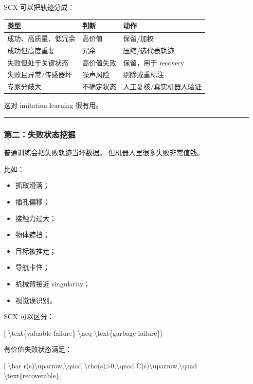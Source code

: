 \documentclass[
  12pt,
]{ctexart}
\providecommand{\tightlist}{%
  \setlength{\itemsep}{0pt}\setlength{\parskip}{0pt}}
\begin{document}
SCX 可以把轨迹分成：

\begin{longtable}[]{@{}lll@{}}
\toprule\noalign{}
类型 & 判断 & 动作 \\
\midrule\noalign{}
\endhead
\bottomrule\noalign{}
\endlastfoot
成功、高质量、低冗余 & 高价值 & 保留/加权 \\
成功但高度重复 & 冗余 & 压缩/选代表轨迹 \\
失败但处于关键状态 & 高价值失败 & 保留，用于 recovery \\
失败且异常/传感器坏 & 噪声风险 & 剔除或重标注 \\
专家分歧大 & 不确定状态 & 人工复核/真实机器人验证 \\
\end{longtable}

这对 imitation learning 很有用。

\begin{center}\rule{0.5\linewidth}{0.5pt}\end{center}

\subsubsection{第二：失败状态挖掘}\label{ux7b2cux4e8cux5931ux8d25ux72b6ux6001ux6316ux6398}

普通训练会把失败轨迹当坏数据。 但机器人里很多失败非常值钱。

比如：

\begin{itemize}
\tightlist
\item
  抓取滑落；
\item
  插孔偏移；
\item
  接触力过大；
\item
  物体遮挡；
\item
  目标被推走；
\item
  导航卡住；
\item
  机械臂接近 singularity；
\item
  视觉误识别。
\end{itemize}

SCX 可以区分：

{[} \textbackslash text\{valuable failure\} \textbackslash neq
\textbackslash text\{garbage failure\}{]}

有价值失败状态满足：

{[} \textbackslash bar r(s)\textbackslash uparrow,\textbackslash quad
\textbackslash rho(s)\textgreater0,\textbackslash quad
C(s)\textbackslash uparrow,\textbackslash quad
\textbackslash text\{recoverable\}{]}
\end{document}
